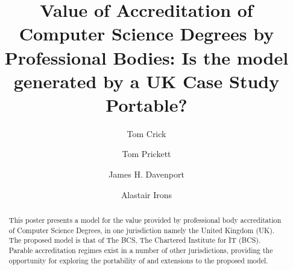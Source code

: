 \documentclass[sigconf]{acmart}
\begin{document}
\fancyhead{}


\title{Value of Accreditation of Computer Science Degrees by Professional Bodies:  Is the model generated by a UK Case Study Portable?}



\author{Tom Crick}

\author{Tom Prickett}

\author{James H. Davenport}


\begin{comment}


\author{Paul Hanna}
\affiliation{%
\institution{Ulster University}
\city{Belfast}
\country{UK}
}
\email{jrp.hanna@ulster.ac.uk}

\end{comment}

\author{Alastair Irons}


%
\renewcommand{\shortauthors}{Trovato and Tobin, et al.}

%
\begin{abstract}
	This poster presents a model for the value provided by professional body accreditation of Computer Science Degrees, in one jurisdiction namely the United Kingdom (UK). The proposed model is that of The BCS, The Chartered Institute for IT (BCS). Parable accreditation regimes exist in a number of other jurisdictions, providing the opportunity for exploring the portability of and extensions to the proposed model.
\end{abstract}
\end{document}
